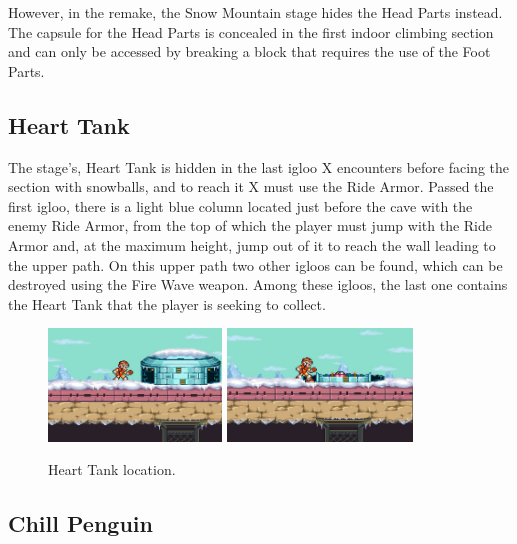 However, in the remake, the Snow Mountain stage hides the Head Parts instead. The capsule for the Head Parts is concealed in the first indoor climbing section and can only be accessed by breaking a block that requires the use of the Foot Parts.


\subsection{Heart Tank}\label{Penguin:heart_tank}

The stage's, Heart Tank is hidden in the last igloo X encounters before facing the section with snowballs, and to reach it X must use the Ride Armor. Passed the first igloo, there is a light blue column located just before the cave with the enemy Ride Armor,  from the top of which the player must jump with the Ride Armor and, at the maximum height, jump out of it to reach the wall leading to the upper path. On this upper path two other igloos can be found, which can be destroyed using the Fire Wave weapon. Among these igloos, the last one contains the Heart Tank that the player is seeking to collect.

\begin{figure}[htp]
	\centering
		\centering
		\includegraphics[height=3cm]{figures/X1/Chill_penguin/Chill_heart_1.jpg}
		\includegraphics[height=3cm]{figures/X1/Chill_penguin/Chill_heart_2.jpg}
	\caption{Heart Tank location.}
\end{figure}

\subsection{Chill Penguin}\label{boss:Chill_Penguin}

